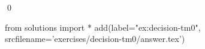 
\begin{ex} 
  \label{ex:decision-tm0}
  
  \qed
\end{ex} 
\begin{python0}
from solutions import *
add(label="ex:decision-tm0",
    srcfilename='exercises/decision-tm0/answer.tex') 
\end{python0}

